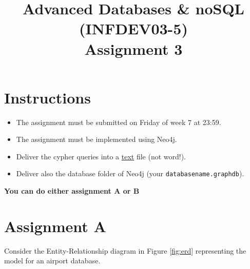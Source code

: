 \documentclass[10pt,a4paper]{article}
\title{Advanced Databases \& noSQL (INFDEV03-5) \\ Assignment 3}
\author { }
\date { }
\begin{document}
\maketitle

\section*{Instructions}
\begin{itemize}[noitemsep]
\item The assignment must be submitted on Friday of week 7 at 23:59.
\item The assignment must be implemented using Neo4j.
\item Deliver the cypher queries into a \underline{text} file (not word!).
\item Deliver also the database folder of Neo4j (your \texttt{database\textunderscore name.graphdb}).
\end{itemize}

\textbf{You can do either assignment A or B}

\section*{Assignment A}
Consider the Entity-Relationship diagram in Figure \ref{fig:erd} representing the model for an airport database.
\end{document}
